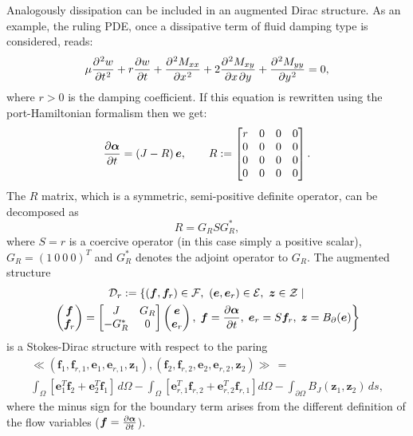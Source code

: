 \documentclass[11pt]{article}
\begin{document}
	Analogously dissipation can be included in an augmented Dirac structure. As an example, the ruling PDE, once a dissipative term of fluid damping type is considered, reads:
	\begin{equation}
	\mu \diffp[2]{w}{t}  + r \diffp{w}{t}+ \diffp[2]{M_{xx}}{x} + 2 \diffp{M_{xy}}{x,y} + \diffp[2]{M_{yy}}{y} = 0,
	\end{equation}
	where $r>0$ is the damping coefficient.
	If this equation is rewritten using the port-Hamiltonian formalism then we get:
	\begin{equation}
	\diffp{\bm\alpha}{t} = \left(J - R \right) \bm{e}, \qquad 
	R := 
	\begin{bmatrix}
	r & 0 & 0 & 0 \\
	0 & 0 & 0 & 0 \\
	0 & 0 & 0 & 0 \\
	0 & 0 & 0 & 0 \\
	\end{bmatrix}.
	\end{equation}
	The $R$ matrix, which is a symmetric, semi-positive definite operator, can be decomposed as
	\begin{equation}
	R = G_R S G_R^* , 
	\end{equation}
	where $S=r$ is a coercive operator (in this case simply a positive scalar), $G_R =  \left(1 \ 0 \ 0 \ 0 \right)^T$ and $G_R^*$ denotes the adjoint operator to $G_R$. The augmented structure
	\begin{multline}
	\mathcal{D}_r := \left\{ (\bm{f}, \bm{f}_r) \in \mathcal{F}, \ (\bm{e}, \bm{e}_r) \in \mathcal{E}, \ \bm{z} \in \mathcal{Z} \; |  \right. \\
	\left. 
	\begin{pmatrix}
	\bm{f} \\
	\bm{f}_r \\
	\end{pmatrix}
	= 
	\begin{bmatrix}
	J & G_R \\
	-G_R^* & 0 \\
	\end{bmatrix}
	\begin{pmatrix}
	\bm{e} \\
	\bm{e}_r \\
	\end{pmatrix}, 
	\;\bm{f} = \diffp{\bm{\alpha}}{t}, \; \bm{e}_r = S \bm{f}_r, \;  \bm{z} = B_{\partial}(\bm{e})
	\right\}
	\end{multline}
	is a Stokes-Dirac structure with respect to the paring 
	\begin{multline}
	\ll (\bm{f}_1, \bm{f}_{r, 1}, \bm{e}_1, \bm{e}_{r, 1}, \bm{z}_1), (\bm{f}_2, \bm{f}_{r, 2}, \bm{e}_2, \bm{e}_{r, 2}, \bm{z}_2) \gg  \,= \\
	\int_{\Omega} \left[ \bm{e}_1^T \bm{f}_2 + \bm{e}_2^T \bm{f}_1\right] \,d\Omega - \int_{\Omega} \left[ \bm{e}_{r, 1}^T \bm{f}_{r, 2} + \bm{e}_{r, 2}^T \bm{f}_{r, 1} \right] d\Omega  - \int_{\partial \Omega} B_J(\bm{z}_1, \bm{z}_2) \, ds,
	\end{multline}
	where the minus sign for the boundary term arises from the different definition of the flow variables ($\bm{f}= \diffp{\bm{\alpha}}{t}$).
	
\end{document}
